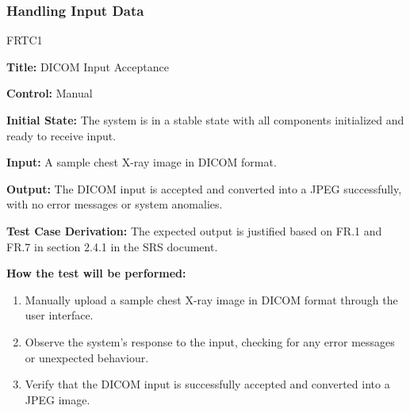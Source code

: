 \documentclass[12pt, titlepage]{article}
\begin{document}
\subsubsection{Handling Input Data}

\begin{itemize}
    \begin{item}
        FRTC1
        \begin{mdframed}[linewidth=0.5mm]
            \textbf{Title:} DICOM Input Acceptance \par
            \textbf{Control:} Manual \par
            \textbf{Initial State:} The system is in a stable state with all components initialized and ready to receive input. \par
            \textbf{Input:} A sample chest X-ray image in DICOM format. \par
            \textbf{Output:} The DICOM input is accepted and converted into a JPEG successfully, with no error messages or system anomalies. \par
            \textbf{Test Case Derivation:} The expected output is justified based on FR.1 and FR.7 in section 2.4.1 in the SRS document. \par
            \textbf{How the test will be performed:}
            \begin{enumerate}[noitemsep]
                \item Manually upload a sample chest X-ray image in DICOM format through the user interface.
                \item Observe the system's response to the input, checking for any error messages or unexpected behaviour.
                \item Verify that the DICOM input is successfully accepted and converted into a JPEG image.
            \end{enumerate}
        \end{mdframed}
    \end{item}


\end{itemize}
\end{document}
